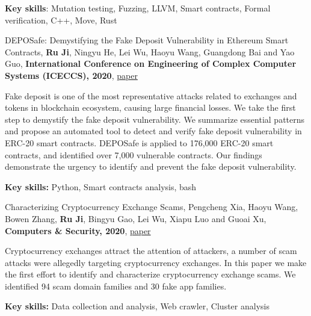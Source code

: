 \documentclass[letterpaper,10pt]{article}
\begin{document}
	\textbf{Key skills}: Mutation testing, Fuzzing, LLVM, Smart contracts, Formal verification, C++, Move, Rust
	  
        \vspace{-5pt}
        
        \item{DEPOSafe: Demystifying the Fake Deposit Vulnerability in Ethereum Smart Contracts, \textbf{Ru Ji}, Ningyu He, Lei Wu, Haoyu Wang, Guangdong Bai and Yao Guo, \textbf{International Conference on Engineering of Complex Computer Systems (ICECCS), 2020}, \href{https://ieeexplore.ieee.org/abstract/document/9376204}{\textcolor{linkblue}{paper}}}
        
        Fake deposit is one of the most representative attacks related to exchanges and tokens in blockchain ecosystem, causing large financial losses. We take the first step to demystify the fake deposit vulnerability. We summarize essential patterns and propose an automated tool to detect and verify fake deposit vulnerability in ERC-20 smart contracts. DEPOSafe is applied to 176,000 ERC-20 smart contracts, and identified over 7,000 vulnerable contracts. Our findings demonstrate the urgency to identify and prevent the fake deposit vulnerability.
        
        \textbf{Key skills:} Python, Smart contracts analysis, bash
        
        \vspace{-5pt}
        \item{Characterizing Cryptocurrency Exchange Scams, Pengcheng Xia, Haoyu Wang, Bowen Zhang, \textbf{Ru Ji}, Bingyu Gao, Lei Wu, Xiapu Luo and Guoai Xu, \textbf{Computers \& Security, 2020}, \href{https://www.sciencedirect.com/science/article/abs/pii/S0167404820302662}{\textcolor{linkblue}{paper}}}
        
        Cryptocurrency exchanges attract the attention of attackers, a number of scam attacks were allegedly targeting cryptocurrency exchanges. In this paper we make the first effort to identify and characterize cryptocurrency exchange scams. We identified 94 scam domain families and 30 fake app families.
        
        \textbf{Key skills:} Data collection and analysis, Web crawler, Cluster analysis
        
\end{document}
